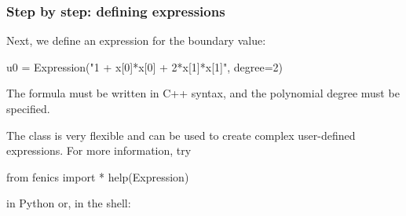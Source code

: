 \begin{frame}[fragile]
  \frametitle{Step by step: defining expressions}

  Next, we define an expression for the boundary value:
  \vspace{-1em}
  \begin{python}
u0 = Expression("1 + x[0]*x[0] + 2*x[1]*x[1]", degree=2)
  \end{python}
  The formula must be written in C++ syntax, and
  the polynomial degree must be specified.

  \bigskip

  The  class is very flexible and can be used to
  create complex user-defined expressions. For more information, try
\vspace{-1em}
  \begin{python}
from fenics import *
help(Expression)
  \end{python}
  in Python or, in the shell:
  \vspace{-1em}

\end{frame}
